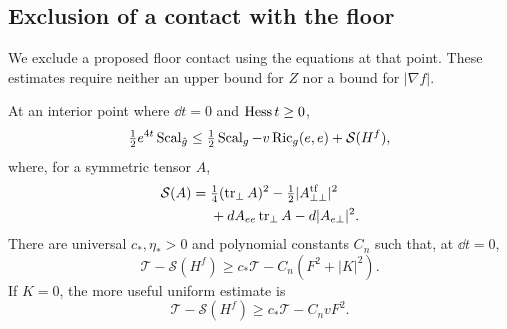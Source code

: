 \subsection{Exclusion of a contact with the floor}

We exclude a proposed floor contact using the equations at that point.
These estimates require neither an upper bound for $Z$ nor a bound for
$|\nabla f|$.

\begin{lemma}\label{n3:deformation:floor-curvature}
At an interior point where $\dd t=0$ and $\operatorname{Hess} t\ge0$,
\begin{equation}\label{n3:deformation:floor-gauss}
 \tfrac12e^{4t}\operatorname{Scal}_{\hat g}
 \le \tfrac12\operatorname{Scal}_g-v\operatorname{Ric}_g(e,e)+\mathcal S(H^f),
\end{equation}
where, for a symmetric tensor $A$,
\begin{equation}\label{n3:deformation:gauss-quadratic}
 \begin{split}
 \mathcal S(A)={}&\tfrac14(\operatorname{tr}_\perp A)^2
 -\tfrac12|A_{\perp\perp}^{\operatorname{tf}}|^2\\
 &+dA_{ee}\operatorname{tr}_\perp A-d|A_{e\perp}|^2.
 \end{split}
\end{equation}
There are universal $c_*,\eta_*>0$ and polynomial constants $C_n$ such
that, at $\dd t=0$,
\begin{equation}\label{n3:deformation:floor-algebra-general}
 \mathcal T-\mathcal S(H^f)
 \ge c_*\mathcal T-C_n(F^2+|K|^2).
\end{equation}
If $K=0$, the more useful uniform estimate is
\begin{equation}\label{n3:deformation:floor-algebra-end}
 \mathcal T-\mathcal S(H^f)\ge c_*\mathcal T-C_n vF^2.
\end{equation}
\end{lemma}

